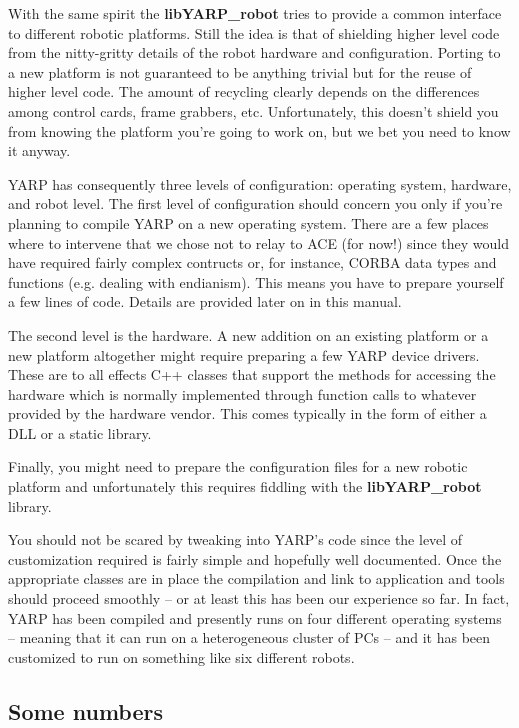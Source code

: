 With the same spirit the {\bf libYARP\_robot} tries to provide a common interface to different robotic platforms. Still the idea is that of shielding higher level code from the nitty-gritty details of the robot hardware and configuration. Porting to a new platform is not guaranteed to be anything trivial but for the reuse of higher level code. The amount of recycling clearly depends on the differences among control cards, frame grabbers, etc. Unfortunately, this doesn't shield you from knowing the platform you're going to work on, but we bet you need to know it anyway.


YARP has consequently three levels of configuration: operating system, hardware, and robot level. The first level of configuration should concern you only if you're planning to compile YARP on a new operating system. There are a few places where to intervene that we chose not to relay to ACE (for now!) since they would have required fairly complex contructs or, for instance, CORBA data types and functions (e.g. dealing with endianism). This means you have to prepare yourself a few lines of code. Details are provided later on in this manual.

The second level is the hardware. A new addition on an existing platform or a new platform altogether might require preparing a few YARP device drivers. These are to all effects C++ classes that support the methods for accessing the hardware which is normally implemented through function calls to whatever provided by the hardware vendor. This comes typically in the form of either a DLL or a static library.

Finally, you might need to prepare the configuration files for a new robotic platform and unfortunately this requires fiddling with the {\bf libYARP\_robot} library.

You should not be scared by tweaking into YARP's code since the level of customization required is fairly simple and hopefully well documented. Once the appropriate classes are in place the compilation and link to application and tools should proceed smoothly -- or at least this has been our experience so far. In fact, YARP has been compiled and presently runs on four different operating systems -- meaning that it can run on a heterogeneous cluster of PCs -- and it has been customized to run on something like six different robots.

\subsection{Some numbers}
\label{sect:numbers}

